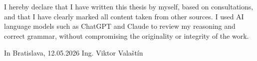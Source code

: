 \section*{}
\vspace*{\fill}
\noindent
I hereby declare that I have written this thesis by myself, based on consultations, and that I have clearly marked all content taken from other sources. I used AI language models such as ChatGPT and Claude to review my reasoning and correct grammar, without compromising the originality or integrity of the work.
\vspace{20 mm}

\noindent
In Bratislava, 12.05.2026
\hfill
Ing. Viktor Valaštín
